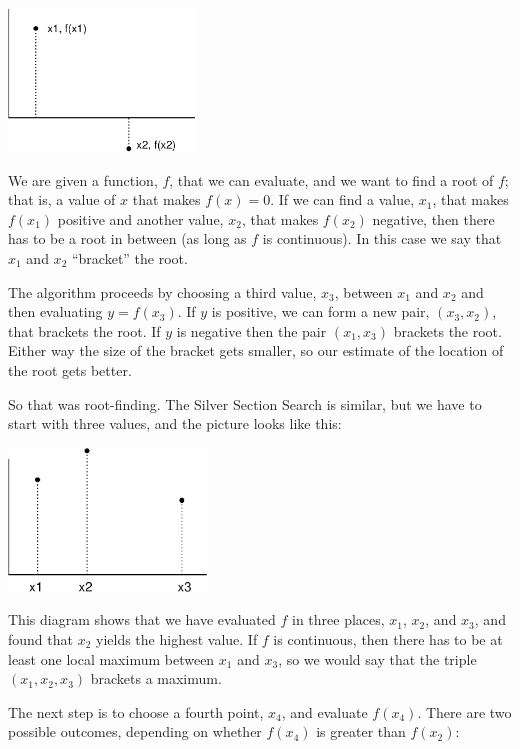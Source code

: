 \documentclass[
]{book}
\numberwithin{Answer}{chapter}
\numberwithin{Exercise}{chapter}
\begin{document}
\beforefig \centerline{\includegraphics[height=1.5in]{figs/secant.eps}}

We are given a function, $f$, that we can evaluate, and
we want to find a root of $f$; that is, a value of $x$ that makes
$f(x)=0$.  If we can find a value, $x_1$, that makes $f(x_1)$ positive
and another value, $x_2$, that makes $f(x_2)$ negative, then there has
to be a root in between (as long as $f$ is continuous).  In this
case we say that $x_1$ and $x_2$ ``bracket'' the root.

The algorithm proceeds by choosing a third value, $x_3$, between
$x_1$ and $x_2$ and then evaluating $y = f(x_3)$.  If $y$ is
positive, we can form a new pair, $(x_3, x_2)$, that brackets the
root.  If $y$ is negative then the pair $(x_1, x_3)$ brackets the root.
Either way the size of the bracket gets smaller, so our
estimate of the location of the root gets better.

So that was root-finding.  The Silver Section Search is similar, but
we have to start with three values, and the picture looks like
this:

\beforefig \centerline{\includegraphics[height=1.5in]{figs/golden1.eps}}

This diagram shows that we have evaluated $f$ in three places,
$x_1$, $x_2$, and $x_3$, and found that $x_2$ yields the highest
value.  If $f$ is continuous, then there has to be at least one
local maximum between $x_1$ and $x_3$, so we would say that the
triple $(x_1, x_2, x_3)$ brackets a maximum.

The next step is to choose a fourth point, $x_4$, and evaluate
$f(x_4)$.  There are two possible outcomes, depending on whether
$f(x_4)$ is greater than $f(x_2)$:
\end{document}
